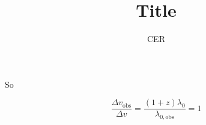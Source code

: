 \documentclass[12pt]{amsart}
\title{Title}
\author{CER}
\date{} %
\begin{document}
\maketitle
So

\begin{equation}
\frac{\Delta v_\mathrm{obs}}{\Delta v} = \frac{(1+z)\lambda_0}{\lambda_{0,\mathrm{obs}}} = 1
\end{equation}

\end{document}
